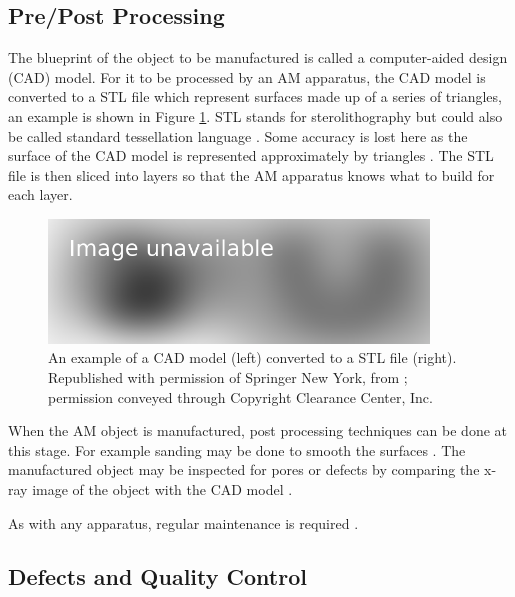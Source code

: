 \subsection{Pre/Post Processing}

The blueprint of the object to be manufactured is called a computer-aided design (CAD) model. For it to be processed by an AM apparatus, the CAD model is converted to a STL file \citep{3d1989sterolithography, 3d2019what} which represent surfaces made up of a series of triangles, an example is shown in Figure \ref{fig:literature_stl}. STL stands for sterolithography but could also be called standard tessellation language \citep{wong2012review}. Some accuracy is lost here as the surface of the CAD model is represented approximately by triangles \citep{gibson2010additive}. The STL file is then sliced into layers \citep{jamieson1995direct, vatani2009enhanced} so that the AM apparatus knows what to build for each layer.

\begin{figure}
  \centering
  \includegraphics[width=0.9\textwidth]{../figures/literatureReview/literature_stl.png}
  \caption{An example of a CAD model (left) converted to a STL file (right). Republished with permission of Springer New York, from \cite{gibson2010additive}; permission conveyed through Copyright
Clearance Center, Inc.}
  \label{fig:literature_stl}
\end{figure}

When the AM object is manufactured, post processing techniques can be done at this stage. For example sanding may be done to smooth the surfaces \citep{gibson2010additive}. The manufactured object may be inspected for pores or defects by comparing the x-ray image of the object with the CAD model \citep{lee2015compliance, villarraga2015assessing, kim2016inspection}.

As with any apparatus, regular maintenance is required \citep{bell2014maintaining}.

\subsection{Defects and Quality Control}

